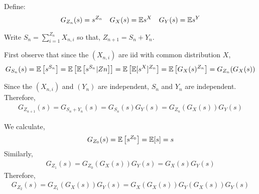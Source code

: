 \begin{solution}[Solution]
Define:
\begin{align*}
    G_{Z_n}(s) = s^{Z_n} && G_X(s) = \mathbb{E} s^X && G_Y(s)=\mathbb{E} s^Y 
\end{align*}

Write \( S_n = \sum_{i=1}^{Z_n}X_{n,i} \) so that, \( Z_{n+1}=S_n+Y_n \).


First observe that since the \( (X_{n,i}) \) are iid with common distribution \( X \),
\begin{align*}
    G_{S_n}(s) = \mathbb{E}\left[s^{S_n}\right] = \mathbb{E}\left[\mathbb{E}\left[s^{S_n}|Zn\right]\right] = \mathbb{E} \left[ \mathbb{E}[s^X]^{Z_n} \right] = \mathbb{E} \left[ G_X(s)^{Z_n} \right] = G_{Z_n}(G_X(s))
\end{align*}

Since the \( (X_{n,i}) \) and \( (Y_n) \) are independent, \( S_n \) and \( Y_n \) are independent. Therefore,
\begin{align*}
    G_{Z_{n+1}}(s) = G_{S_n+Y_n}(s) = G_{S_n}(s)G_{Y}(s)  = G_{Z_n}(G_X(s))G_Y(s)
\end{align*}


We calculate, 
\begin{align*}
    G_{Z_0}(s) = \mathbb{E}\left[s^{Z_0}\right] = \mathbb{E}[s] = s
\end{align*}
Similarly,
\begin{align*}
    G_{Z_1}(s) = G_{Z_0}(G_X(s))G_Y(s) = G_X(s)G_Y(s) 
\end{align*}
Therefore,
\begin{align*}
    G_{Z_2}(s) = G_{Z_1}(G_X(s))G_Y(s) = G_X(G_X(s))G_Y(G_X(s))G_Y(s)
\end{align*}

\iffalse
Therefore,
\begin{align*}
    G_{Z_{n+1}} &= \EE s^{Z_{n+1}} 
    = \EE \left[s^{Y_n+\sum_{i=1}^{Z_n}X_{n,i}} \right]
    = \EE\left[\EE \left[s^{Y_n+\sum_{i=1}^{Z_n}X_{n,i}} \Big| Z_n \right]\right]
\end{align*}

Thus, since the \( (X_{n,i}) \) and \( (Y_n) \) are all independent,
\begin{align*}
    \EE\left[\EE \left[s^{Y_n+\sum_{i=1}^{Z_n}X_{n,i}} \Big| Z_n \right]\right]
    = \EE\left[\EE \left[s^{Y_n}\right]\prod_{i=1}^{Z_n}\EE \left[s^{X_{n,i}}\right]\right]
\end{align*}
Since \( (X_{n,i}) \) and \( (Y_n) \) are iid,
\begin{align*}
    \EE\left[\EE \left[s^{Y_n}\right]\prod_{i=1}^{Z_n}\EE \left[s^{X_{n,i}}\right]\right]
    = \EE\left[ (\EE s^X)^{Z_n}(\EE s^Y)\right] 
    = \EE\left[ (G_X(s)G_Y(s)^{1/Z_n})^{Z_n}\right] 
\end{align*}

Therefore,
\begin{align*}
    G_{Z_{n+1}}(s) = G_{Z_n}\left( G_X(s) G_Y(s)^{1/Z_n} \right)
\end{align*}
\fi
\end{solution}

